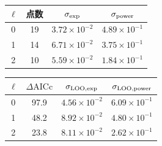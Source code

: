 \documentclass[UTF8,fontset=fandol,12pt,a4paper,oneside,openany]{ctexrep}
\begin{document}
\noindent\begin{minipage}{\linewidth}
\captionsetup{type=table}\caption{指数模型、幂律模型及固定热斜率的比较。}\label{audit:tab:tail-models}
\centering\fontsize{10.5}{14}\selectfont
\setlength{\tabcolsep}{6pt}\renewcommand{\arraystretch}{1.2}
\par{}\par\smallskip
\begin{tabular}{cccc}\toprule
$\ell$ & 点数 & $\sigma_{\rm exp}$ & $\sigma_{\rm power}$\\\midrule
0 & 19 & $3.72\times10^{-2}$ & $4.89\times10^{-1}$\\
1 & 14 & $6.71\times10^{-2}$ & $3.75\times10^{-1}$\\
2 & 10 & $5.59\times10^{-2}$ & $1.84\times10^{-1}$\\
\bottomrule\end{tabular}
\par\medskip
\par{}\par\smallskip
\begin{tabular}{cccc}\toprule
$\ell$ & $\Delta\mathrm{AICc}$ & $\sigma_{\rm LOO,exp}$ & $\sigma_{\rm LOO,power}$\\\midrule
0 & 97.9 & $4.56\times10^{-2}$ & $6.09\times10^{-1}$\\
1 & 48.2 & $8.92\times10^{-2}$ & $4.80\times10^{-1}$\\
2 & 23.8 & $8.11\times10^{-2}$ & $2.62\times10^{-1}$\\
\bottomrule\end{tabular}
\end{minipage}\par\addvspace{10pt}
\par\addvspace{14pt}
\end{document}
